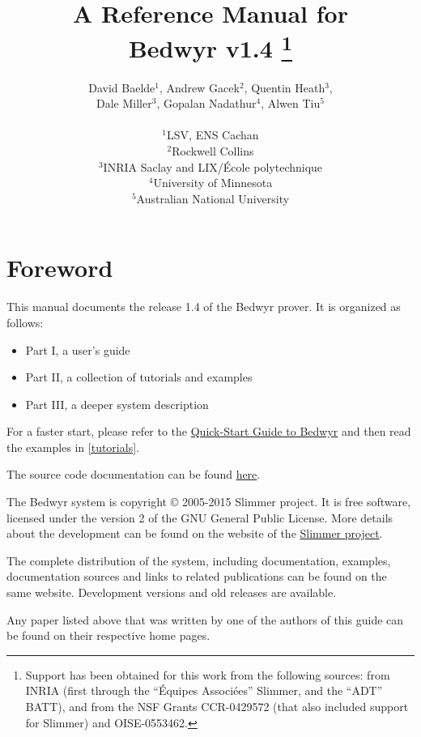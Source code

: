\documentclass[a4paper]{article} %
\title{{\Huge A Reference Manual for \\Bedwyr v1.4}
   \thanks{Support has been obtained for this work from the following
           sources: from INRIA (first through the ``\'Equipes
           Associ{\'e}es'' Slimmer, and the ``ADT'' BATT),
           and from the NSF Grants CCR-0429572 (that also included
           support for Slimmer) and OISE-0553462.}
}
\author{David Baelde$^1$,
        Andrew Gacek$^2$,
        Quentin Heath$^3$,\\
        Dale Miller$^3$,
        Gopalan Nadathur$^4$,
        Alwen Tiu$^5$\\\\
        $^1$LSV, ENS Cachan\\
        $^2$Rockwell Collins\\
        $^3$INRIA Saclay and LIX/\'Ecole polytechnique\\
        $^4$University of Minnesota\\
        $^5$Australian National University}
\begin{document}
\maketitle
\tableofcontents
\newpage


\section*{Foreword}

This manual documents the release 1.4 of the Bedwyr prover.  It is
organized as follows:
\begin{itemize}
  \item Part I, a user's guide
  \item Part II, a collection of tutorials and examples
  \item Part III, a deeper system description
\end{itemize}

For a faster start, please refer to the
\href{http://slimmer.gforge.inria.fr/bedwyr/doc/quickstart.html}
  {Quick-Start Guide to Bedwyr}
and then read the examples in \autoref{tutorials}.

The source code documentation can be found
\href{http://slimmer.gforge.inria.fr/bedwyr/doc/libref/}{here}.

The Bedwyr system is copyright \copyright{} 2005-2015 Slimmer project.
It is free software, licensed under the version 2 of the GNU General
Public License.  More details about the development can be found on the
website of the \href{http://slimmer.gforge.inria.fr/}{Slimmer project}.

The complete distribution of the system, including documentation,
examples, documentation sources and links to related publications can be
found on the same website.  Development versions and old releases are
available.

\lstlistoflistings
\listoffigures







\appendix



\noindent Any paper listed above that was written by one of the authors
of this guide can be found on their respective home pages.
\end{document}
